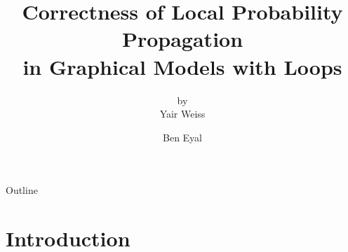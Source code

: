 \documentclass[handout]{beamer}
\title[]{Correctness of Local Probability Propagation\\in Graphical Models with Loops}
\subtitle{by\\Yair Weiss}
\author{Ben Eyal}
\begin{document}
\begin{frame}
    \titlepage
\end{frame}

\begin{frame}{Outline}
    \tableofcontents
\end{frame}

\section{Introduction}
\end{document}

